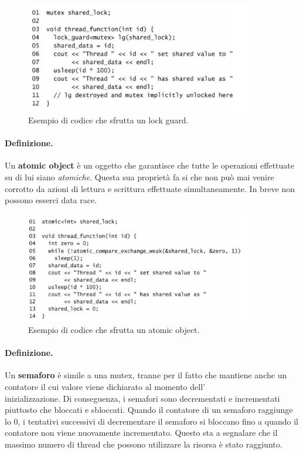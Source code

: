 \begin{figure}[H]
    \centering
    \includegraphics[width=10cm, keepaspectratio]{capitoli/secure_coding/img/cap_6/lockguard.png}
    \caption{Esempio di codice che sfrutta un lock guard.}
\end{figure}

\paragraph{Definizione.}
Un \textbf{atomic object} è un oggetto che garantisce che tutte le operazioni effettuate su di lui
siano \textit{atomiche}. Questa sua proprietà fa si che non può mai venire corrotto da azioni di
lettura e scrittura effettuate simultaneamente. In breve non possono esserci data race.

\begin{figure}[H]
    \centering
    \includegraphics[width=10cm, keepaspectratio]{capitoli/secure_coding/img/cap_6/atomicobject.png}
    \caption{Esempio di codice che sfrutta un atomic object.}
\end{figure}

\paragraph{Definizione.}
Un \textbf{semaforo} è simile a una mutex, tranne per il fatto che
mantiene anche un contatore il cui valore viene dichiarato al momento dell'\\inizializzazione.
Di conseguenza, i semafori sono decrementati e incrementati piuttosto che bloccati e sbloccati.
Quando il contatore di un semaforo raggiunge lo 0, i tentativi successivi di decrementare
il semaforo si bloccano fino a quando il contatore non viene nuovamente incrementato.
Questo sta a segnalare che il massimo numero di thread che possono utilizzare la risorsa è
stato raggiunto.\ \\


